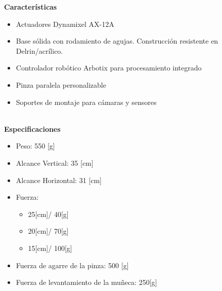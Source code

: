             \textbf{Características}
            \begin{itemize}
                \item Actuadores Dynamixel AX-12A 
                \item Base sólida con rodamiento de agujas. Construcción resistente en Delrin/acrílico.
                \item Controlador robótico Arbotix para procesamiento integrado
                \item Pinza paralela personalizable
                \item Soportes de montaje para cámaras y sensores
            \end{itemize}
            
            \phantom{saltodelineaforzado >:D}\\
            
            \textbf{Especificaciones}
            \begin{itemize}
                \item Peso: 550 [g]
                \item Alcance Vertical: 35 [cm]
                \item Alcance Horizontal: 31 [cm]
                \item Fuerza:
                \begin{itemize}
                    \item 25[cm]/ 40[g]
                    \item 20[cm]/ 70[g]
                    \item 15[cm]/ 100[g]
                \end{itemize}
                \item Fuerza de agarre de la pinza: 500 [g]
                \item Fuerza de levantamiento de la muñeca: 250[g]
            \end{itemize}

